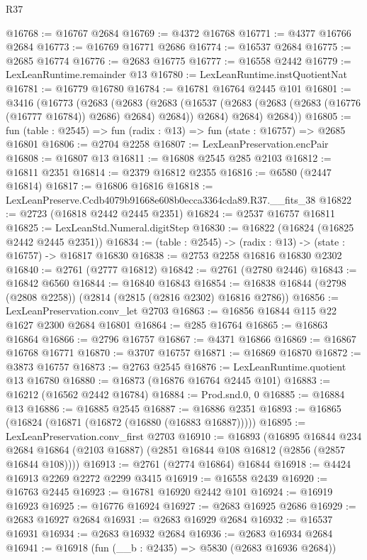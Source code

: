 \begin{lexlean}{R37}
\begin{coremodule}
@16768 := @16767 @2684
@16769 := @4372 @16768
@16771 := @4377 @16766 @2684
@16773 := @16769 @16771 @2686
@16774 := @16537 @2684
@16775 := @2685 @16774
@16776 := @2683 @16775
@16777 := @16558 @2442
@16779 := LexLeanRuntime.remainder @13
@16780 := LexLeanRuntime.instQuotientNat
@16781 := @16779 @16780
@16784 := @16781 @16764 @2445 @101
@16801 := @3416
    (@16773
      (@2683
        (@2683
          (@2683 (@16537 (@2683 (@2683 (@2683 (@16776 (@16777 @16784)) @2686) @2684) @2684)) @2684)
          @2684)
        @2684))
@16805 := fun (table : @2545) => fun (radix : @13) => fun (state : @16757) => @2685 @16801
@16806 := @2704 @2258
@16807 := LexLeanPreservation.encPair
@16808 := @16807 @13
@16811 := @16808 @2545 @285 @2103
@16812 := @16811 @2351
@16814 := @2379 @16812 @2355
@16816 := @6580 (@2447 @16814)
@16817 := @16806 @16816
@16818 := LexLeanPreserve.Ccdb4079b91668e608b0ecca3364cda89.R37.__fits_38
@16822 := @2723 (@16818 @2442 @2445 @2351)
@16824 := @2537 @16757 @16811
@16825 := LexLeanStd.Numeral.digitStep
@16830 := @16822 (@16824 (@16825 @2442 @2445 @2351))
@16834 := (table : @2545) -> (radix : @13) -> (state : @16757) -> @16817 @16830
@16838 := @2753 @2258 @16816 @16830 @2302
@16840 := @2761 (@2777 @16812)
@16842 := @2761 (@2780 @2446)
@16843 := @16842 @6560
@16844 := @16840 @16843
@16854 := @16838 @16844 (@2798 (@2808 @2258)) (@2814 (@2815 (@2816 @2302) @16816 @2786))
@16856 := LexLeanPreservation.conv_let @2703
@16863 := @16856 @16844 @115 @22 @1627 @2300 @2684 @16801
@16864 := @285 @16764
@16865 := @16863 @16864
@16866 := @2796 @16757
@16867 := @4371 @16866
@16869 := @16867 @16768 @16771
@16870 := @3707 @16757
@16871 := @16869 @16870
@16872 := @3873 @16757
@16873 := @2763 @2545
@16876 := LexLeanRuntime.quotient @13 @16780
@16880 := @16873 (@16876 @16764 @2445 @101)
@16883 := @16212 (@16562 @2442 @16784)
@16884 := Prod.snd.{0, 0}
@16885 := @16884 @13
@16886 := @16885 @2545
@16887 := @16886 @2351
@16893 := @16865 (@16824 (@16871 (@16872 (@16880 (@16883 @16887)))))
@16895 := LexLeanPreservation.conv_first @2703
@16910 := @16893
    (@16895
      @16844
      @234
      @2684
      @16864
      (@2103 @16887)
      (@2851 @16844 @108 @16812 (@2856 (@2857 @16844 @108))))
@16913 := @2761 (@2774 @16864) @16844
@16918 := @4424 @16913 @2269 @2272 @2299 @3415
@16919 := @16558 @2439
@16920 := @16763 @2445
@16923 := @16781 @16920 @2442 @101
@16924 := @16919 @16923
@16925 := @16776 @16924
@16927 := @2683 @16925 @2686
@16929 := @2683 @16927 @2684
@16931 := @2683 @16929 @2684
@16932 := @16537 @16931
@16934 := @2683 @16932 @2684
@16936 := @2683 @16934 @2684
@16941 := @16918 (fun (__b : @2435) => @5830 (@2683 @16936 @2684))

\end{coremodule}
\end{lexlean}
